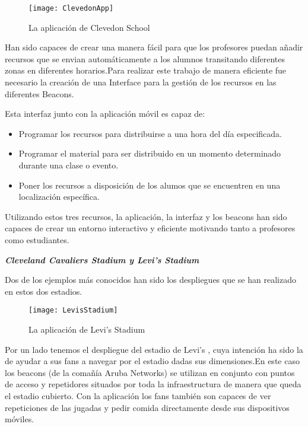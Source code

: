 \begin{figure}[H]
	\centering
	\texttt{[image: ClevedonApp]}
	\caption{La aplicación de Clevedon School}
	\label{fig:beaconRange}
\end{figure}


Han sido capaces de crear una manera fácil para que los profesores puedan añadir recursos que se envian automáticamente a los alumnos transitando diferentes zonas en diferentes horarios.Para realizar este trabajo de manera eficiente fue necesario la creación de una Interface para la gestión de los recursos en las diferentes Beacons.


Esta interfaz junto con la aplicación móvil es capaz de: 

\begin{itemize}
\item Programar los recursos para distribuirse a una hora del día especificada. 
\item Programar el material para ser distribuido en un momento determinado durante una clase o evento. 
\item Poner los recursos a disposición de los alumos que se encuentren en una localización específica.
\end{itemize}

Utilizando estos tres recursos, la aplicación, la interfaz y los beacons han sido capaces de crear un entorno interactivo y eficiente motivando tanto a profesores como estudiantes. 

\vspace{5mm}

\textsl{\textbf{{Cleveland Cavaliers Stadium y Levi's Stadium}}}

\vspace{2mm}

Dos de los ejemplos más conocidos han sido los despliegues que se han realizado en estos dos estadios. 

\begin{figure}[H]
	\centering
	\texttt{[image: LevisStadium]}
	\caption{La aplicación de Levi's Stadium}
	\label{fig:levisStadium}
\end{figure}

Por un lado tenemos el despliegue del estadio de Levi's , cuya intención ha sido la de ayudar a sus fans a navegar por el estadio dadas sus dimensiones.En este caso los beacons (de la comañía Aruba Networks) se utilizan en conjunto con puntos de acceso y repetidores situados por toda la infraestructura de manera que queda el estadio cubierto. Con la aplicación los fans también son capaces de ver repeticiones de las jugadas y pedir comida directamente desde sus dispositivos móviles.


